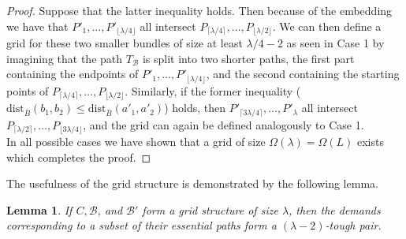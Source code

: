 \documentclass[a4paper,11pt]{article}
\newcommand{\calB}{\mathcal{B}}
\newcommand{\dist}{\mathrm{dist}}
\theoremstyle{plain}
\newtheorem{lemma}[theorem]{Lemma}
\newtheorem{identification rule}{Identification Rule}
\theoremstyle{definition}
\theoremstyle{remark}
\begin{document}
\begin{proof}
Suppose that the latter inequality holds. Then because of the embedding we have that $P'_1,\dots,P'_{\lfloor \lambda/4\rfloor}$ all intersect $P_{\lceil \lambda/4 \rceil},\dots, P_{\lfloor \lambda/2 \rfloor}$. We can then define a grid for these two smaller bundles of size at least $\lambda/4-2$ as seen in Case 1 by imagining that the path $T_\calB$ is split into two shorter paths, the first part containing the endpoints of $P'_1,\dots,P'_{\lfloor \lambda/4\rfloor}$, and the second containing the starting points of $P_{\lceil \lambda/4 \rceil},\dots, P_{\lfloor \lambda/2 \rfloor}$. Similarly, if the former inequality ($\dist_{\bar B}(b_1,b_2) \leq \dist_{\bar B}(a'_1,a'_2)$) holds, then $P'_{\lceil 3\lambda/4 \rceil},\dots,P'_{\lambda}$ all intersect $P_{\lceil \lambda/2 \rceil},\dots, P_{\lfloor 3\lambda/4 \rfloor}$, and the grid can again be defined analogously to Case 1.\\

In all possible cases we have shown that a grid of size $\Omega(\lambda)=\Omega(L)$ exists which completes the proof.
\end{proof}

The usefulness of the grid structure is demonstrated by the following lemma.

\begin{lemma}\label{lem:gridsarehard}
If $C,\calB$, and $\calB'$ form a grid structure of size $\lambda$, then the demands corresponding to a subset of their essential paths form a  $(\lambda-2)$-tough pair.
\end{lemma}
\end{document}

